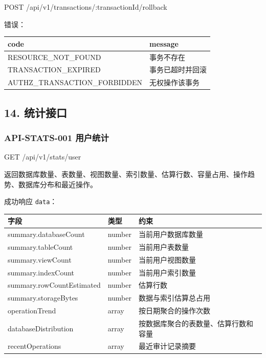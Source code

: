 \documentclass[
  a4paper,
  UTF8]{ctexart}
\newenvironment{Shaded}{}{}
\newcommand{\NormalTok}[1]{#1}
\begin{document}
\begin{Shaded}
\begin{Highlighting}[]
\NormalTok{POST /api/v1/transactions/:transactionId/rollback}
\end{Highlighting}
\end{Shaded}

错误：

\begin{longtable}[]{@{}ll@{}}
\toprule
code & message \\
\midrule
\endhead
RESOURCE\_NOT\_FOUND & 事务不存在 \\
TRANSACTION\_EXPIRED & 事务已超时并回滚 \\
AUTHZ\_TRANSACTION\_FORBIDDEN & 无权操作该事务 \\
\bottomrule
\end{longtable}

\hypertarget{ux7edfux8ba1ux63a5ux53e3}{%
\subsection{14. 统计接口}\label{ux7edfux8ba1ux63a5ux53e3}}

\hypertarget{api-stats-001-ux7528ux6237ux7edfux8ba1}{%
\subsubsection{API-STATS-001
用户统计}\label{api-stats-001-ux7528ux6237ux7edfux8ba1}}

\begin{Shaded}
\begin{Highlighting}[]
\NormalTok{GET /api/v1/stats/user}
\end{Highlighting}
\end{Shaded}

返回数据库数量、表数量、视图数量、索引数量、估算行数、容量占用、操作趋势、数据库分布和最近操作。

成功响应 \texttt{data}：

\begin{longtable}[]{@{}lll@{}}
\toprule
字段 & 类型 & 约束 \\
\midrule
\endhead
summary.databaseCount & number & 当前用户数据库数量 \\
summary.tableCount & number & 当前用户表数量 \\
summary.viewCount & number & 当前用户视图数量 \\
summary.indexCount & number & 当前用户索引数量 \\
summary.rowCountEstimated & number & 估算行数 \\
summary.storageBytes & number & 数据与索引估算总占用 \\
operationTrend & array & 按日期聚合的操作次数 \\
databaseDistribution & array & 按数据库聚合的表数量、估算行数和容量 \\
recentOperations & array & 最近审计记录摘要 \\
\bottomrule
\end{longtable}
\end{document}

